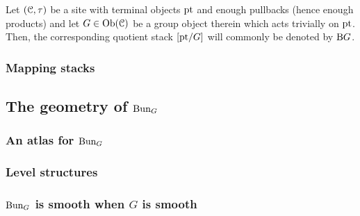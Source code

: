             \begin{convention} \label{conv: classifying_stacks_of_groups}
                Let $(\mathcal{C}, \tau)$ be a site with terminal objects $\mathrm{pt}$ and enough pullbacks (hence enough products) and let $G \in \mathrm{Ob}(\mathcal{C})$ be a group object therein which acts trivially on $\mathrm{pt}$. Then, the corresponding quotient stack $[\mathrm{pt}/G]$ will commonly be denoted by $\mathrm{B} G$.
            \end{convention}
        
        \subsubsection{Mapping stacks}
    
    \subsection{The geometry of \texorpdfstring{$\mathrm{Bun}_G$}{}}
        \subsubsection{An atlas for \texorpdfstring{$\mathrm{Bun}_G$}{}}
        
        \subsubsection{Level structures}
        
        \subsubsection{\texorpdfstring{$\mathrm{Bun}_G$}{} is smooth when \texorpdfstring{$G$}{} is smooth}